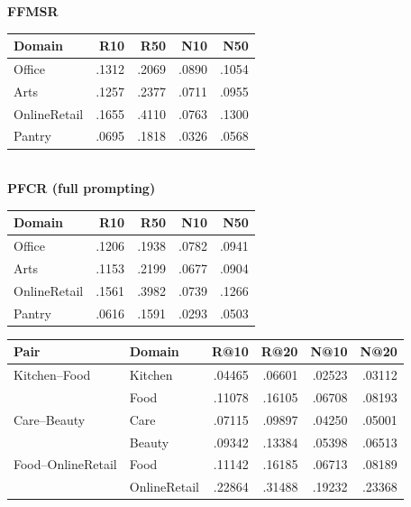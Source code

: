 \newpage
\par\noindent\begin{minipage}{\columnwidth}\centering\small
{}
\label{tab:ffmsr-pfcr-published}
\textbf{FFMSR}~\citep{lu2025ffmsr}\\[2pt]
\setlength{\tabcolsep}{2.5pt}
\begin{tabular}{@{}lrrrr@{}}
\toprule
Domain & R10 & R50 & N10 & N50 \\
\midrule
Office & .1312 & .2069 & .0890 & .1054 \\
Arts & .1257 & .2377 & .0711 & .0955 \\
OnlineRetail & .1655 & .4110 & .0763 & .1300 \\
Pantry & .0695 & .1818 & .0326 & .0568 \\
\bottomrule
\end{tabular}
\\[4pt]
\textbf{PFCR (full prompting)}~\citep{guo2024pfcr}\\[2pt]
\begin{tabular}{@{}lrrrr@{}}
\toprule
Domain & R10 & R50 & N10 & N50 \\
\midrule
Office & .1206 & .1938 & .0782 & .0941 \\
Arts & .1153 & .2199 & .0677 & .0904 \\
OnlineRetail & .1561 & .3982 & .0739 & .1266 \\
Pantry & .0616 & .1591 & .0293 & .0503 \\
\bottomrule
\end{tabular}

\end{minipage}\par\addvspace{8pt}
\par\noindent\begin{minipage}{\columnwidth}\centering\small
{}
\label{tab:external-published-b}
\setlength{\tabcolsep}{2.5pt}
\begin{tabular}{@{}llrrrr@{}}
\toprule
Pair & Domain & R@10 & R@20 & N@10 & N@20 \\
\midrule
Kitchen--Food & Kitchen & .04465 & .06601 & .02523 & .03112 \\
 & Food & .11078 & .16105 & .06708 & .08193 \\
Care--Beauty & Care & .07115 & .09897 & .04250 & .05001 \\
 & Beauty & .09342 & .13384 & .05398 & .06513 \\
Food--OnlineRetail & Food & .11142 & .16185 & .06713 & .08189 \\
 & OnlineRetail & .22864 & .31488 & .19232 & .23368 \\
\bottomrule
\end{tabular}

\end{minipage}\par\addvspace{8pt}

